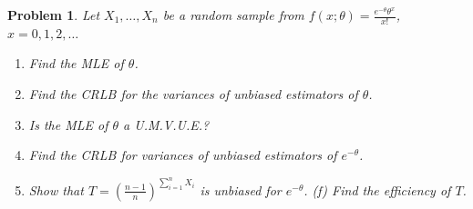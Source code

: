 \documentclass[12pt,a4paper]{report}
\theoremstyle{definition}
\theoremstyle{plain}
\newtheorem{problemx}{Problem}[section]
\newenvironment{problem}{\begin{problemx}}{\end{problemx}}
\begin{document}
\begin{problem}
Let $X_1,\ldots,X_n$ be a random sample from
$f(x;\theta)=\frac{e^{-\theta}\theta^x}{x!}$, $x=0,1,2,\ldots$
\begin{enumerate}
\item[(a).] Find the MLE of $\theta$.
\item[(b).] Find the CRLB for the variances of unbiased estimators of $\theta$.
\item[(c).] Is the MLE of $\theta$ a U.M.V.U.E.?
\item[(d).] Find the CRLB for variances of unbiased estimators of $e^{-\theta}$.
\item[(e).] Show that $T=\left(\frac{n-1}{n}\right)^{\sum_{i=1}^nX_i}$ is unbiased
for $e^{-\theta}$. \quad (f) Find the efficiency of $T$.
\end{enumerate}
\end{problem}
\end{document}
